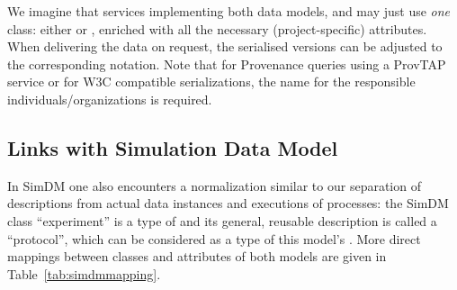 We imagine that services implementing both data models,  and  may just use \emph{one} class: either  or , enriched with all the necessary (project-specific) attributes. When delivering the data on request, the serialised versions can be adjusted to the corresponding notation.
Note that for Provenance queries using a ProvTAP service or for W3C compatible serializations, the name  for the responsible individuals/organizations is required.


\subsection{Links with Simulation Data Model}
In SimDM one also encounters a normalization similar to our separation of descriptions from 
actual data instances and executions of processes: the SimDM class ``experiment'' 
is a type of  and its general, reusable description is called a ``protocol'',
which can be considered as a type of this model's . 
More direct mappings between classes and attributes of both models are given in Table~\ref{tab:simdmmapping}.


